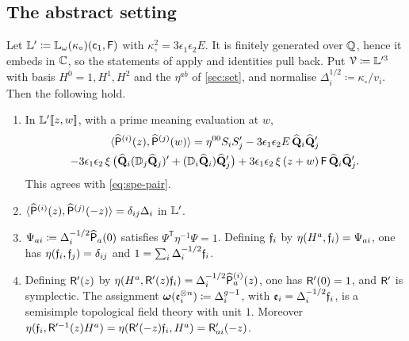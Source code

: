 \subsection{The abstract setting}

\begin{lem}
\label{lem:fra-setup}
Let $\mathbb{L}'\coloneqq\mathbb{L}_{\omega}(\kappa_{\circ})(\mathsf{c}_{1},\mathsf{F})$ with $\kappa_{\circ}^2=3\epsilon_1\epsilon_2E$. It is finitely generated over $\mathbb{Q}$, hence it embeds in $\mathbb{C}$, so the statements of \cite{PPZ15} apply and identities pull back. Put $\mathcal{V}\coloneqq\mathbb{L}'^3$ with basis $H^0=1,H^1,H^2$ and the $\eta^{ab}$ of \cref{sec:set}, and normalise $\Delta_i^{1/2}\coloneqq\kappa_{\circ}/v_i$. Then the following hold.
\begin{enumerate}
\item In $\mathbb{L}'[\![ z,w ]\!]$, with a prime meaning evaluation at $w$,
\begin{multline}
\label{eq:fra-pair}
\langle\widehat{\mathsf{P}}^{(i)}(z),\widehat{\mathsf{P}}^{(j)}(w)\rangle=\eta^{00}S_iS_j'-3\epsilon_1\epsilon_2E\,\widehat{\mathbf{Q}}_i\widehat{\mathbf{Q}}_j'\\
-3\epsilon_1\epsilon_2\,\xi\,\big(\widehat{\mathbf{Q}}_i(\mathbb{D}_j\widehat{\mathbf{Q}}_j)'+(\mathbb{D}_i\widehat{\mathbf{Q}}_i)\widehat{\mathbf{Q}}_j'\big)+3\epsilon_1\epsilon_2\,\xi\,(z+w)\,\mathsf{F}\,\widehat{\mathbf{Q}}_i\widehat{\mathbf{Q}}_j'.
\end{multline}
This agrees with \eqref{eq:spe-pair}.
\item $\langle\widehat{\mathsf{P}}^{(i)}(z),\widehat{\mathsf{P}}^{(j)}(-z)\rangle=\delta_{ij}\Delta_i$ in $\mathbb{L}'$.
\item $\Psi_{ai}\coloneqq\Delta_i^{-1/2}\widehat{\mathsf{P}}_a(0)$ satisfies $\Psi^{\mathsf{T}}\eta^{-1}\Psi=1$. Defining $\mathfrak{f}_i$ by $\eta(H^a,\mathfrak{f}_i)=\Psi_{ai}$, one has $\eta(\mathfrak{f}_i,\mathfrak{f}_j)=\delta_{ij}$ and $1=\sum_i\Delta_i^{-1/2}\mathfrak{f}_i$.
\item Defining $\mathsf{R}'(z)$ by $\eta(H^a,\mathsf{R}'(z)\mathfrak{f}_i)=\Delta_i^{-1/2}\widehat{\mathsf{P}}_a^{(i)}(z)$, one has $\mathsf{R}'(0)=1$, and $\mathsf{R}'$ is symplectic. The assignment $\boldsymbol{\omega}(\mathfrak{e}_i^{\otimes n})\coloneqq\Delta_i^{g-1}$, with $\mathfrak{e}_i=\Delta_i^{-1/2}\mathfrak{f}_i$, is a semisimple topological field theory with unit $1$. Moreover $\eta(\mathfrak{f}_i,\mathsf{R}'^{-1}(z)H^a)=\eta(\mathsf{R}'(-z)\mathfrak{f}_i,H^a)=\mathsf{R}'_{ai}(-z)$.
\end{enumerate}
\end{lem}

